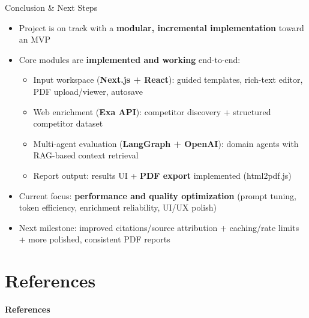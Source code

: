 \documentclass{beamer}
\begin{document}
\begin{frame}{Conclusion \& Next Steps}
\begin{itemize}
    \item Project is on track with a \textbf{modular, incremental implementation} toward an MVP
    \item Core modules are \textbf{implemented and working} end-to-end:
    \begin{itemize}
        \item Input workspace (\textbf{Next.js + React}): guided templates, rich-text editor, PDF upload/viewer, autosave
        \item Web enrichment (\textbf{Exa API}): competitor discovery + structured competitor dataset
        \item Multi-agent evaluation (\textbf{LangGraph + OpenAI}): domain agents with RAG-based context retrieval
        \item Report output: results UI + \textbf{PDF export} implemented (html2pdf.js)
    \end{itemize}
    \item Current focus: \textbf{performance and quality optimization} (prompt tuning, token efficiency, enrichment reliability, UI/UX polish)
    \item Next milestone: improved citations/source attribution + caching/rate limits + more polished, consistent PDF reports
\end{itemize}
\end{frame}




\section{References}

\begin{frame}
\centering
\Huge \textbf{References}
\end{frame}
\end{document}
